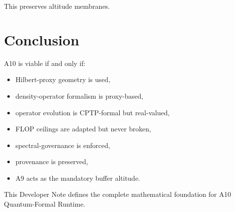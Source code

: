\documentclass[11pt]{article}
\begin{document}
This preserves altitude membranes.

\section*{Conclusion}

A10 is viable if and only if:

\begin{itemize}
\item Hilbert-proxy geometry is used,
\item density-operator formalism is proxy-based,
\item operator evolution is CPTP-formal but real-valued,
\item FLOP ceilings are adapted but never broken,
\item spectral-governance is enforced,
\item provenance is preserved,
\item A9 acts as the mandatory buffer altitude.
\end{itemize}

This Developer Note defines the complete mathematical foundation for
A10 Quantum-Formal Runtime.
\end{document}
